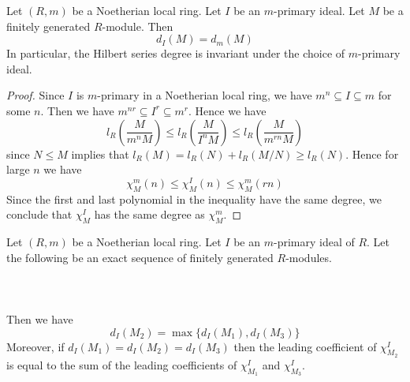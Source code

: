 \documentclass[a4paper]{article}
\begin{document}
\begin{prp}{}{} Let $(R,m)$ be a Noetherian local ring. Let $I$ be an $m$-primary ideal. Let $M$ be a finitely generated $R$-module. Then $$d_I(M)=d_m(M)$$ In particular, the Hilbert series degree is invariant under the choice of $m$-primary ideal. \tcbline
\begin{proof}
Since $I$ is $m$-primary in a Noetherian local ring, we have $m^n\subseteq I\subseteq m$ for some $n$. Then we have $m^{nr}\subseteq I^r\subseteq m^r$. Hence we have $$l_R\left(\frac{M}{m^nM}\right)\leq l_R\left(\frac{M}{I^nM}\right)\leq l_R\left(\frac{M}{m^{rn}M}\right)$$ since $N\leq M$ implies that $l_R(M)=l_R(N)+l_R(M/N)\geq l_R(N)$. Hence for large $n$ we have $$\chi_M^m(n)\leq\chi_M^I(n)\leq\chi_M^m(rn)$$ Since the first and last polynomial in the inequality have the same degree, we conclude that $\chi_M^I$ has the same degree as $\chi_M^m$. 
\end{proof}
\end{prp}

\begin{prp}{}{} Let $(R,m)$ be a Noetherian local ring. Let $I$ be an $m$-primary ideal of $R$. Let the following be an exact sequence of finitely generated $R$-modules. \\~\\
\\~\\
Then we have $$d_I(M_2)=\max\{d_I(M_1),d_I(M_3)\}$$ Moreover, if $d_I(M_1)=d_I(M_2)=d_I(M_3)$ then the leading coefficient of $\chi_{M_2}^I$ is equal to the sum of the leading coefficients of $\chi_{M_1}^I$ and $\chi_{M_3}^I$. 
\end{prp}
\end{document}
